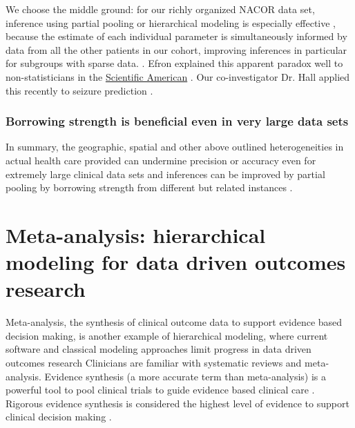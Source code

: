 \documentclass[11pt,notitlepage]{article}
\begin{document}
We choose the middle ground: for our richly organized NACOR data set, inference 
using partial pooling or hierarchical modeling is especially effective , because 
the estimate of each individual parameter is simultaneously informed by data from 
all the other patients in our cohort, improving inferences in particular for 
subgroups with sparse data. \cite{Gelman2009}. Efron explained this apparent 
paradox well to non-statisticians in the 
\href{http://www.nature.com/scientificamerican/journal/v236/n5/pdf/
scientificamerican0577-119.pdf}{Scientific American}
\cite{Stein_paradox_Scientific_American}. 
Our co-investigator Dr. Hall applied this recently to seizure prediction \cite{Hall2009a}. 

\subsubsection*{Borrowing strength is beneficial even in very large data sets}
In summary, the geographic, spatial and other above outlined heterogeneities 
in actual health care provided can undermine precision or accuracy even for 
extremely large clinical data sets and inferences can be improved by partial 
pooling by borrowing strength from different but related instances
\cite{Tukey1963borrowing,Jones1986collected}. 

\section*{Meta-analysis: hierarchical modeling for data driven outcomes research}
Meta-analysis, the synthesis of clinical outcome data to support evidence based decision making, is another example of hierarchical modeling, where current software and classical modeling approaches limit progress in data driven outcomes research \cite{Andreae2015} Clinicians are familiar with systematic reviews and meta-analysis\cite{Sackett1996}. Evidence synthesis (a more accurate term than meta-analysis) is a powerful tool to pool clinical trials to guide evidence based clinical care \cite{Ashby2000}. Rigorous evidence synthesis is considered the highest level of evidence to support clinical decision making \cite{Cook1997}. 
\end{document}
